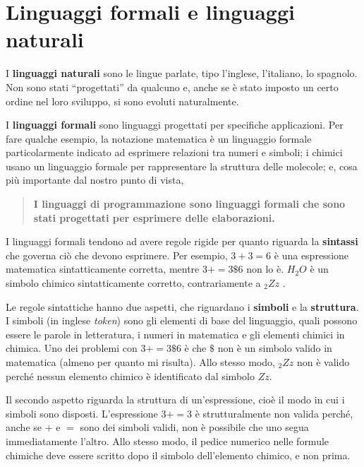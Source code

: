 \documentclass[10pt]{book}
\begin{document}
\section{Linguaggi formali e linguaggi naturali}

I {\bf linguaggi naturali} sono le lingue parlate, tipo l'inglese, l'italiano, lo spagnolo. Non sono stati ``progettati'' da qualcuno e, anche se è stato imposto un certo ordine nel loro sviluppo, si sono evoluti naturalmente.

I {\bf linguaggi formali} sono linguaggi progettati per specifiche   applicazioni. Per fare qualche esempio, la notazione matematica è un linguaggio formale particolarmente indicato ad esprimere relazioni tra numeri e simboli; i chimici usano un linguaggio formale per rappresentare la struttura delle molecole; e, cosa più importante dal nostro punto di vista, 

\begin{quote}
{\bf I linguaggi di programmazione sono linguaggi formali che sono
   stati progettati per esprimere delle elaborazioni.}
\end{quote}

I linguaggi formali tendono ad avere regole rigide per quanto riguarda la {\bf sintassi} che governa ciò che devono esprimere. Per esempio,
$3 + 3 = 6$ è una espressione matematica sintatticamente corretta, mentre
$3 += 3 \$ 6$ non lo è.
$H_2O$ è un simbolo chimico sintatticamente corretto, contrariamente a $_2Zz$ .

Le regole sintattiche hanno due aspetti, che riguardano i {\bf simboli} e la
{\bf struttura}. I simboli (in inglese {\em token}) sono gli elementi di base del linguaggio, quali possono essere le parole in letteratura, i numeri in matematica e gli elementi chimici in chimica. Uno dei problemi con 
$3 += 3 \$ 6$ è che \( \$ \) non è un simbolo valido in matematica
(almeno per quanto mi risulta). Allo stesso modo, $_2Zz$ non è valido perché nessun elemento chimico è identificato dal simbolo $Zz$.

Il secondo aspetto riguarda la struttura di un'espressione, cioè il modo in cui i simboli sono disposti. L'espressione
$3 += 3$ è strutturalmente non valida perché, anche se $+$ e $=$ sono dei simboli validi, non è possibile che uno segua immediatamente l'altro. Allo stesso modo, il pedice numerico nelle formule chimiche deve essere scritto dopo il simbolo dell'elemento chimico, e non prima.
\end{document}
